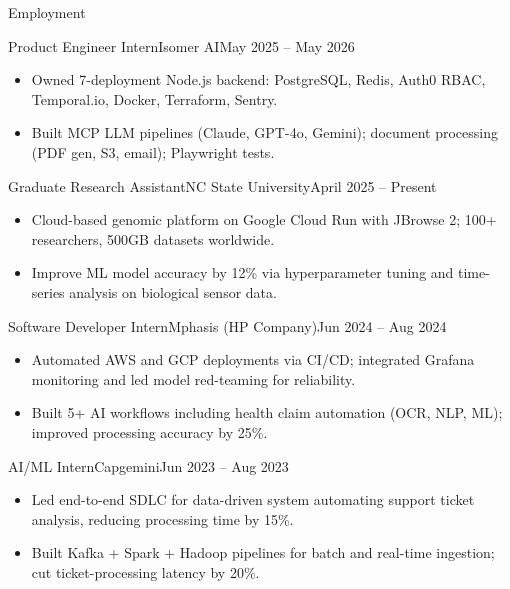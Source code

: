 \documentclass[]{mcdowellcv}
\begin{document}
\makeheader

\begin{cvsection}{Employment}
  \begin{cvsubsection}{Product Engineer Intern}{Isomer AI}{May 2025 -- May 2026}
    \begin{itemize}
      \item Owned 7-deployment Node.js backend: PostgreSQL, Redis, Auth0 RBAC, Temporal.io, Docker, Terraform, Sentry.
      \item Built MCP LLM pipelines (Claude, GPT-4o, Gemini); document processing (PDF gen, S3, email); Playwright tests.
    \end{itemize}
    \vspace{-1.5pt}
  \end{cvsubsection}

  \begin{cvsubsection}{Graduate Research Assistant}{NC State University}{April 2025 -- Present}
    \begin{itemize}
      \item Cloud-based genomic platform on Google Cloud Run with JBrowse 2; 100+ researchers, 500GB datasets worldwide.
      \item Improve ML model accuracy by 12\% via hyperparameter tuning and time-series analysis on biological sensor data.
    \end{itemize}
    \vspace{-1.5pt}
  \end{cvsubsection}

  \begin{cvsubsection}{Software Developer Intern}{Mphasis (HP Company)}{Jun 2024 -- Aug 2024}
    \begin{itemize}
      \item Automated AWS and GCP deployments via CI/CD; integrated Grafana monitoring and led model red-teaming for reliability.
      \item Built 5+ AI workflows including health claim automation (OCR, NLP, ML); improved processing accuracy by 25\%.
    \end{itemize}
    \vspace{-1.5pt}
  \end{cvsubsection}

  \begin{cvsubsection}{AI/ML Intern}{Capgemini}{Jun 2023 -- Aug 2023}
    \begin{itemize}
      \item Led end-to-end SDLC for data-driven system automating support ticket analysis, reducing processing time by 15\%.
      \item Built Kafka + Spark + Hadoop pipelines for batch and real-time ingestion; cut ticket-processing latency by 20\%.
    \end{itemize}
    \vspace{-1.5pt}
  \end{cvsubsection}
\end{cvsection}
\end{document}
